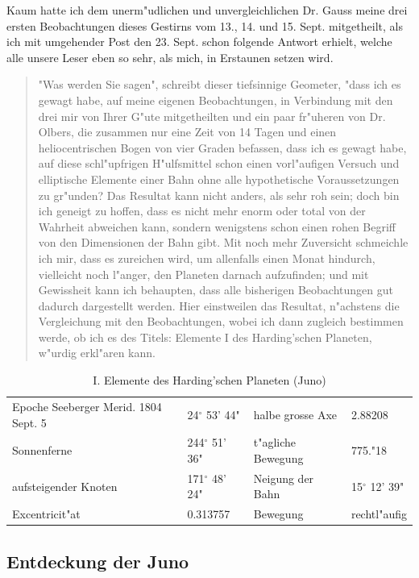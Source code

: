 \documentclass[12pt,a4paper]{article}
\begin{document}
Kaum hatte ich dem unerm"udlichen und unvergleichlichen Dr. Gauss meine drei ersten Beobachtungen dieses Gestirns vom 13., 14. und 15. Sept. mitgetheilt, als ich mit umgehender Post den 23. Sept. schon folgende Antwort erhielt, welche alle unsere Leser eben so sehr, als mich, in Erstaunen setzen wird.

\begin{quote}
"Was werden Sie sagen", schreibt dieser tiefsinnige Geometer, "dass ich es gewagt habe, auf meine eigenen Beobachtungen, in Verbindung mit den drei mir von Ihrer G"ute mitgetheilten und ein paar fr"uheren von Dr. Olbers, die zusammen nur eine Zeit von 14 Tagen und einen heliocentrischen Bogen von vier Graden befassen, dass ich es gewagt habe, auf diese schl"upfrigen H"ulfsmittel schon einen vorl"aufigen Versuch und elliptische Elemente einer Bahn ohne alle hypothetische Voraussetzungen zu gr"unden? Das Resultat kann nicht anders, als sehr roh sein; doch bin ich geneigt zu hoffen, dass es nicht mehr enorm oder total von der Wahrheit abweichen kann, sondern wenigstens schon einen rohen Begriff von den Dimensionen der Bahn gibt. Mit noch mehr Zuversicht schmeichle ich mir, dass es zureichen wird, um allenfalls einen Monat hindurch, vielleicht noch l"anger, den Planeten darnach aufzufinden; und mit Gewissheit kann ich behaupten, dass alle bisherigen Beobachtungen gut dadurch dargestellt werden. Hier einstweilen das Resultat, n"achstens die Vergleichung mit den Beobachtungen, wobei ich dann zugleich bestimmen werde, ob ich es des Titels: Elemente I des Harding'schen Planeten, w"urdig erkl"aren kann.
\end{quote}

\begin{table}[H]
\centering
\begin{tabular}{l l | l l}
\toprule
Epoche Seeberger Merid. 1804 Sept. 5 & 24$^\circ$ 53' 44" & halbe grosse Axe & 2.88208 \\
Sonnenferne & 244$^\circ$ 51' 36" & t"agliche Bewegung & 775."18 \\
aufsteigender Knoten & 171$^\circ$ 48' 24" & Neigung der Bahn & 15$^\circ$ 12' 39" \\
Excentricit"at & 0.313757 & Bewegung & rechtl"aufig \\
\bottomrule
\end{tabular}
\caption{I. Elemente des Harding'schen Planeten (Juno)}
\end{table}

\subsection{Entdeckung der Juno}
\end{document}
